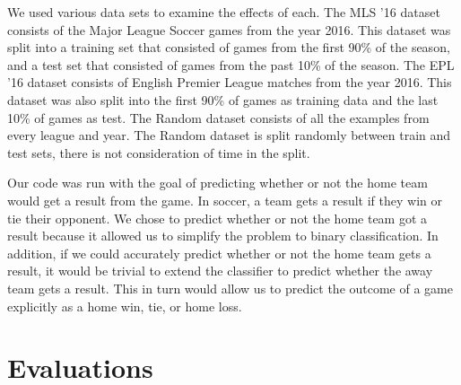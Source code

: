 We used various data sets to examine the effects of each. The MLS '16 dataset consists of the Major League Soccer games from the year 2016. This dataset was split into a training set that consisted of games from the first 90\% of the season, and a test set that consisted of games from the past 10\% of the season. The EPL '16 dataset consists of English Premier League matches from the year 2016. This dataset was also split into the first 90\% of games as training data and the last 10\% of games as test. The Random dataset consists of all the examples from every league and year. The Random dataset is split randomly between train and test sets, there is not consideration of time in the split.

Our code was run with the goal of predicting whether or not the home team would get a result from the game. In soccer, a team gets a result if they win or tie their opponent. We chose to predict whether or not the home team got a result because it allowed us to simplify the problem to binary classification. In addition, if we could accurately predict whether or not the home team gets a result, it would be trivial to extend the classifier to predict whether the away team gets a result. This in turn would allow us to predict the outcome of a game explicitly as a home win, tie, or home loss.


\section{Evaluations}

